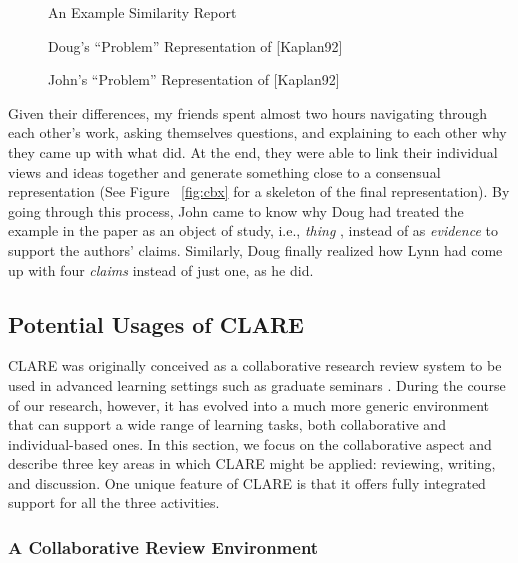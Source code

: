 \begin{figure}[htb]
  \centerline{}
  \caption{An Example Similarity Report}
  \label{fig:clare-compare}
\end{figure}


\begin{figure}[htb]
  \centerline{}
  \caption{Doug's ``Problem'' Representation of [Kaplan92]}
  \label{fig:clare-eg1}
\end{figure}


\begin{figure}[htb]
  \centerline{}
  \caption{John's ``Problem'' Representation of [Kaplan92]}
  \label{fig:clare-eg2}
\end{figure}

Given their differences, my friends spent almost two hours navigating
through each other's work, asking themselves questions, and explaining to
each other why they came up with what did. At the end, they were able to
link their individual views and ideas together and generate something close
to a consensual representation (See Figure ~\ref{fig:cbx} for a skeleton of
the final representation). By going through this process, John came to know
why Doug had treated the example in the paper as an object of study, i.e.,
{\it thing \/}, instead of as {\it evidence\/} to support the authors'
claims.  Similarly, Doug finally realized how Lynn had come up with four
{\it claims\/} instead of just one, as he did.


\subsection{Potential Usages of CLARE}
\label{sec:usage}

CLARE was originally conceived as a collaborative research review system to
be used in advanced learning settings such as graduate seminars
\cite{csdl-92-03}. During the course of our research, however, it has
evolved into a much more generic environment that can support a wide range
of learning tasks, both collaborative and individual-based ones. In this
section, we focus on the collaborative aspect and describe three key areas
in which CLARE might be applied: reviewing, writing, and discussion. One
unique feature of CLARE is that it offers fully integrated support for all
the three activities.

\subsubsection{A Collaborative Review Environment}
\label{sec:coreview}

